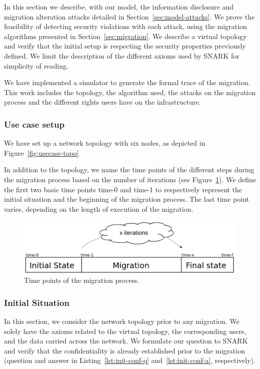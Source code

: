 \label{sec:model-usecase}
In this section we describe, with our model, the information disclosure and migration alteration attacks detailed in Section~\ref{sec:model-attacks}.
We prove the feasibility of detecting security violations with each attack, using the migration algorithms presented in Section~\ref{sec:migration}.
We describe a virtual topology and verify that the initial setup is respecting the security properties previously defined.
We limit the description of the different axioms used by SNARK for simplicity of reading.

We have implemented a simulator to generate the formal trace of the migration.
This work includes the topology, the algorithm used, the attacks on the migration process and the different rights users have on the infrastructure.

\subsubsection{Use case setup}
We have set up a network topology with six nodes, as depicted in Figure~\ref{fig:usecase-topo}




In addition to the topology, we name the time points of the different steps during the migration process based on the number of iterations (see Figure~\ref{fig:time-points}).
We define the first two basic time points time-0 and time-1 to respectively represent the initial situation and the beginning of the migration process. The last time point varies, depending on the length of execution of the migration.


\begin{figure}[htbp]
\centering
\includegraphics[scale=0.5]{figures/time-points-evolution} 
\caption{Time points of the migration process.\label{fig:time-points}}
\end{figure}

\subsubsection{Initial Situation}
In this section, we consider the network topology prior to any migration.
We solely have the axioms related to the virtual topology, the corresponding users, and the data carried across the network.
We formulate our question to SNARK and verify that the confidentiality is already established prior to the migration (question and answer in Listing~\ref{lst:init-conf-q} and~\ref{lst:init-conf-a}, respectively).

